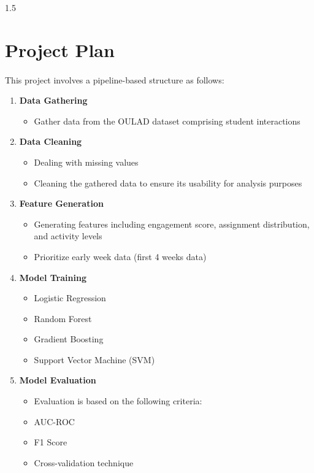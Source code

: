 \begin{spacing}{1.5}
\section{Project Plan}
\paragraph{}
This project involves a pipeline-based structure as follows:

\begin{enumerate}

\item \textbf{Data Gathering}
\begin{itemize}
    \item Gather data from the OULAD dataset comprising student interactions
\end{itemize}

\item \textbf{Data Cleaning}
\begin{itemize}
    \item Dealing with missing values
    \item Cleaning the gathered data to ensure its usability for analysis purposes
\end{itemize}

\item \textbf{Feature Generation}
\begin{itemize}
    \item Generating features including engagement score, assignment distribution, and activity levels
    \item Prioritize early week data (first 4 weeks data)
\end{itemize}

\item \textbf{Model Training}
\begin{itemize}
    \item Logistic Regression
    \item Random Forest
    \item Gradient Boosting
    \item Support Vector Machine (SVM)
\end{itemize}

\item \textbf{Model Evaluation}
\begin{itemize}
    \item Evaluation is based on the following criteria:
    \item AUC-ROC
    \item F1 Score
    \item Cross-validation technique
\end{itemize}


\end{enumerate}
\end{spacing}
